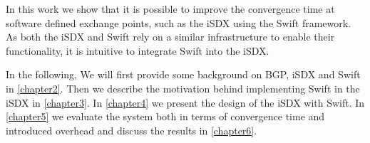 In this work we show that it is possible to improve the convergence time at software defined exchange points, such as the iSDX using the Swift framework. As both the iSDX and Swift rely on a similar infrastructure to enable their functionality, it is intuitive to integrate Swift into the iSDX. 

In the following, We will first provide some background on BGP, iSDX and Swift in \ref{chapter2}. Then we describe the motivation behind implementing Swift in the iSDX in \ref{chapter3}. In \ref{chapter4} we present the design of the iSDX with Swift. In \ref{chapter5} we evaluate the system both in terms of convergence time and introduced overhead and discuss the results in \ref{chapter6}. 



